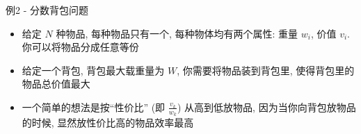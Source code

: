 \begin{frame}[fragile]{例2 - 分数背包问题}
	\begin{itemize}
		\item<1-> 给定 \(N\) 种物品, 每种物品只有一个, 每种物体均有两个属性: 重量 \(w_i\), 价值 \(v_i\). 你可以将物品分成任意等份
		\item<1-> 给定一个背包, 背包最大载重量为 \(W\), 你需要将物品装到背包里, 使得背包里的物品总价值最大
		\item<2-> 一个简单的想法是按``性价比'' (即 \(\frac{v_k}{w_k}\)) 从高到低放物品, 因为当你向背包放物品的时候, 显然放性价比高的物品效率最高
	\end{itemize}
\end{frame}
